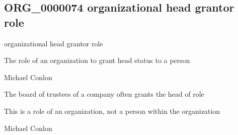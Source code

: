 \documentclass[letterpaper,10pt,english]{sphinxmanual}
\begin{document}
\subsection{ORG\_0000074 \sphinxhyphen{} organizational head grantor role}
\label{\detokenize{doc-ORG_0000074:org-0000074-organizational-head-grantor-role}}\label{\detokenize{doc-ORG_0000074:index-0}}\label{\detokenize{doc-ORG_0000074::doc}}
\begin{sphinxShadowBox}

\sphinxAtStartPar
organizational head grantor role
\end{sphinxShadowBox}

\begin{sphinxShadowBox}

\sphinxAtStartPar
{\hyperref[\detokenize{doc-BFO_0000023::doc}]{}}
\end{sphinxShadowBox}

\begin{sphinxShadowBox}

\sphinxAtStartPar
The role of an organization to grant head status to a person
\end{sphinxShadowBox}

\begin{sphinxShadowBox}

\sphinxAtStartPar
Michael Conlon 
\end{sphinxShadowBox}

\begin{sphinxShadowBox}

\sphinxAtStartPar
The board of trustees of a company often grants the head of role
\end{sphinxShadowBox}

\begin{sphinxShadowBox}

\sphinxAtStartPar
This is a role of an organization, not a person within the organization
\end{sphinxShadowBox}

\begin{sphinxShadowBox}

\sphinxAtStartPar
Michael Conlon 
\end{sphinxShadowBox}
\begin{quote}

\ignorespaces \end{quote}
\end{document}
